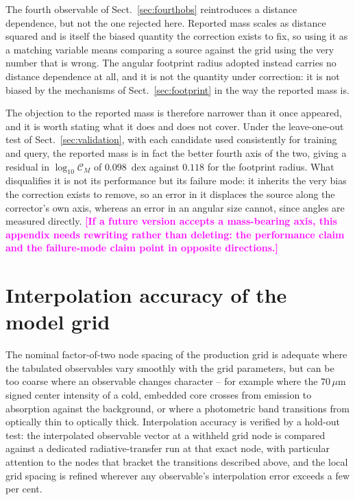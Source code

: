 \documentclass{aa}
\newcommand{\draftnote}[1]{\textcolor{magenta}{\textbf{[#1]}}}
\newcommand{\CM}{\mathcal{C}_{M}}
\begin{document}
The fourth observable of Sect.~\ref{sec:fourthobs} reintroduces a distance
dependence, but not the one rejected here. Reported mass scales as
distance squared and is itself the biased quantity the correction exists
to fix, so using it as a matching variable means comparing a source
against the grid using the very number that is wrong. The angular
footprint radius adopted instead carries no distance dependence at all,
and it is not the quantity under correction: it is not biased by the
mechanisms of Sect.~\ref{sec:footprint} in the way the reported mass is.

The objection to the reported mass is therefore narrower than it once
appeared, and it is worth stating what it does and does not cover. Under
the leave-one-out test of Sect.~\ref{sec:validation}, with each candidate
used consistently for training and query, the reported mass is in fact the
better fourth axis of the two, giving a residual in $\log_{10}\CM$ of
$0.098$~dex against $0.118$ for the footprint radius. What disqualifies it
is not its performance but its failure mode: it inherits the very bias the
correction exists to remove, so an error in it displaces the source along
the corrector's own axis, whereas an error in an angular size cannot,
since angles are measured directly. \draftnote{If a future version accepts a
mass-bearing axis, this appendix needs rewriting rather than deleting: the
performance claim and the failure-mode claim point in opposite
directions.}

\section{Interpolation accuracy of the model grid}
\label{app:interp}

The nominal factor-of-two node spacing of the production grid is adequate
where the tabulated observables vary smoothly with the grid parameters, but
can be too coarse where an observable changes character -- for example
where the $70\,\mu$m signed center intensity of a cold, embedded core
crosses from emission to absorption against the background, or where a
photometric band transitions from optically thin to optically thick.
Interpolation accuracy is verified by a hold-out test: the interpolated
observable vector at a withheld grid node is compared against a dedicated
radiative-transfer run at that exact node, with particular attention to the
nodes that bracket the transitions described above, and the local grid
spacing is refined wherever any observable's interpolation error exceeds a
few per cent.
\end{document}
